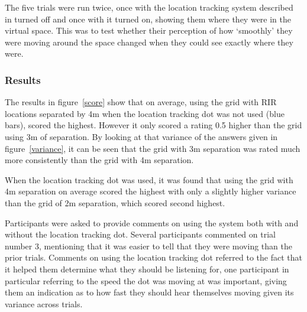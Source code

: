 \documentclass[../../main.tex]{subfiles}
\begin{document}
				The five trials were run twice, once with the location tracking system described in  turned off and once with it turned on, showing them where they were in the virtual space. This was to test whether their perception of how `smoothly' they were moving around the space changed when they could see exactly where they were.

			\subsubsection{Results}

				The results in figure~\ref{score} show that on average, using the grid with \ac{RIR} locations separated by 4m when the location tracking dot was not used (blue bars), scored the highest. However it only scored a rating 0.5 higher than the grid using 3m of separation. By looking at that variance of the answers given in figure~\ref{variance}, it can be seen that the grid with 3m separation was rated much more consistently than the grid with 4m separation.

				When the location tracking dot was used, it was found that using the grid with 4m separation on average scored the highest with only a slightly higher variance than the grid of 2m separation, which scored second highest.

				Participants were asked to provide comments on using the system both with and without the location tracking dot. Several participants commented on trial number 3, mentioning that it was easier to tell that they were moving than the prior trials. Comments on using the location tracking dot referred to the fact that it helped them determine what they should be listening for, one participant in particular referring to the speed the dot was moving at was important, giving them an indication as to how fast they should hear themselves moving given its variance across trials.

\end{document}
